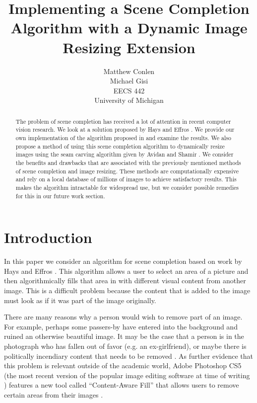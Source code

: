 \documentclass[11pt]{amsart}
\title[Scene Completion and Image Resizing]{Implementing a Scene Completion Algorithm with a Dynamic Image Resizing Extension}
\author{Matthew Conlen \\ Michael Gisi  \\ EECS 442 \\ University of Michigan}
\date{}                                           %
\begin{document}
\maketitle

\begin{abstract}
The problem of scene completion has received a lot of attention in recent computer vision research. We 
look at a solution proposed by Hays and Effros \cite{Hays:2007}. We provide our own implementation of the
algorithm proposed in \cite{Hays:2007} and examine the results. We also propose a method of using this 
scene completion algorithm to dynamically resize images using the seam carving algorithm
given by Avidan and Shamir \cite{Avidan:2007}. We consider the benefits and drawbacks that are associated with the previously mentioned methods of scene completion and image resizing. These methods are computationally expensive and rely on a local database of millions of images to achieve satisfactory results. This makes the algorithm intractable for widespread use, but we consider possible remedies for this in our future work section. 
 
\end{abstract}

\section{Introduction}

In this paper we consider an algorithm for scene completion based on work by Hays and Effros \cite{Hays:2007}. This algorithm allows a user to select an area of a picture and then algorithmically fills that area in with different visual content from another image. This is a difficult problem because the content that is added to the image must look as if it was part of the image originally. 

There are many reasons why a person would wish to remove part of an image. For example, perhaps some passers-by have entered into the background and ruined an otherwise beautiful image. It may be the case that a person is in the photograph who has fallen out of favor (e.g. an ex-girlfriend), or maybe there is politically incendiary content that needs to be removed \cite{King:1997}. As further evidence that this problem is relevant outside of the academic world, Adobe Photoshop CS5 (the most recent version of the popular image editing software at time of writing ) features a new tool called ``Content-Aware Fill'' that allows users to remove certain areas from their images \cite{Barnes:2009}. 
\end{document}

